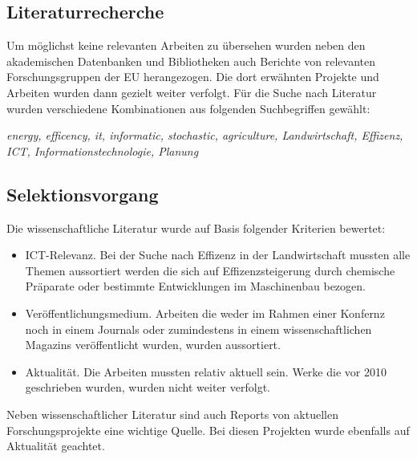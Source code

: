 \subsection{Literaturrecherche}
Um möglichst keine relevanten Arbeiten zu übersehen wurden neben den akademischen Datenbanken und Bibliotheken auch Berichte von relevanten Forschungsgruppen der EU herangezogen. Die dort erwähnten Projekte und Arbeiten wurden dann gezielt weiter verfolgt. Für die Suche nach Literatur wurden verschiedene Kombinationen aus folgenden Suchbegriffen gewählt:

\textit{energy, efficency, it, informatic, stochastic, agriculture, Landwirtschaft, Effizenz, ICT, Informationstechnologie, Planung}

\subsection{Selektionsvorgang}
Die wissenschaftliche Literatur wurde auf Basis folgender Kriterien bewertet:
\begin{itemize}
  \item ICT-Relevanz. Bei der Suche nach Effizenz in der Landwirtschaft mussten alle Themen aussortiert werden die sich auf Effizenzsteigerung durch chemische Präparate oder bestimmte Entwicklungen im Maschinenbau bezogen.
  \item Veröffentlichungsmedium. Arbeiten die weder im Rahmen einer Konfernz noch in einem Journals oder zumindestens in einem wissenschaftlichen Magazins veröffentlicht wurden, wurden aussortiert.
  \item Aktualität. Die Arbeiten mussten relativ aktuell sein. Werke die vor 2010 geschrieben wurden, wurden nicht weiter verfolgt.
\end{itemize}

Neben wissenschaftlicher Literatur sind auch Reports von aktuellen Forschungsprojekte eine wichtige Quelle. Bei diesen Projekten wurde ebenfalls auf Aktualität geachtet.

